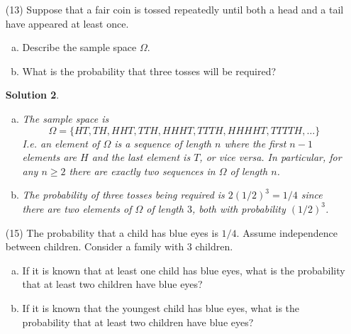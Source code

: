\documentclass[10pt]{article}
\newtheorem*{sol}{Solution}
\begin{document}
\begin{enumerate}
\begin{sol}
The sample space of possible sequences of sides that we can see is
$\Omega = \{RR, GG, RG, GR\}$ where $R$ denotes a red side and $G$ denotes
a green side. The elements of $\Omega$ have probability $1/3$, $1/3$,
$1/6$, and $1/6$. Hence the probability that the other side is green, given
that the first side we see is green is
\[
\frac{1/3}{1/3+1/6} = \frac{2}{3}.
\]
\end{sol}

\item[(13)] Suppose that a fair coin is tossed repeatedly until both a head
and a tail have appeared at least once.
\begin{enumerate}[(a)]
\item Describe the sample space $\Omega$.
\item What is the probability that three tosses will be required?
\end{enumerate}

\begin{sol}
\begin{enumerate}[(a)]
\item The sample space is
\[
\Omega = \{HT, TH, HHT, TTH, HHHT, TTTH, HHHHT, TTTTH, \ldots\}
\]
I.e. an element of $\Omega$ is a sequence of length $n$ where the first
$n-1$ elements are $H$ and the last element is $T$, or vice versa.
In particular, for any $n\geq 2$ there are exactly two sequences in $\Omega$
of length $n$.

\item The probability of three tosses being required is $2(1/2)^3=1/4$ since
there are two elements of $\Omega$ of length $3$, both with probability
$(1/2)^3$.
\end{enumerate}
\end{sol}

\item[(15)] The probability that a child has blue eyes is $1/4$. Assume
independence between children. Consider a family with 3 children.
\begin{enumerate}[(a)]
\item If it is known that at least one child has blue eyes, what is
the probability that at least two children have blue eyes?

\item If it is known that the youngest child has blue eyes, what is
the probability that at least two children have blue eyes?
\end{enumerate}


\end{enumerate}
\end{document}
